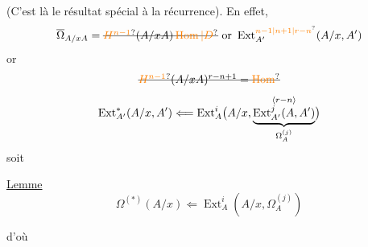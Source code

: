 (C'est là  le résultat spécial à la récurrence). En effet,
\[
 \overline\Omega_{A/xA}=\deleted{\unsure{H^{n-1}}(A/xA)\,\unsure{\operatorname{Hom}|D}}\ \text{or }\operatorname{Ext}_{A'}^{\unsure{n-1|n+1|r-n}}(A/x,A')
\]
or
\[
 \deleted{\unsure{H^{n-1}}(A/xA)^{r-n+1}=\unsure{\operatorname{Hom}}}
\]
\[
 \operatorname{Ext}^{*}_{A'}(A/x,A')\Longleftarrow
 \operatorname{Ext}^{i}_{A}\bigl(A/x,\underbrace{\overset{\inserted{r-n}}{\operatorname{Ext}_{A'}^{j}(A,A')}}_{\Omega_A^{(j)}}\bigr)
\]
soit 

\uline{Lemme}
\[
 \Omega^{(*)}(A/x)\Longleftarrow\operatorname{Ext}^{i}_{A}(A/x,\Omega_A^{(j)})
\]
\margin{[Bien connu $=$ pour $A/x$ remplacé par un $A$-module quelconque]}
 

d'où

